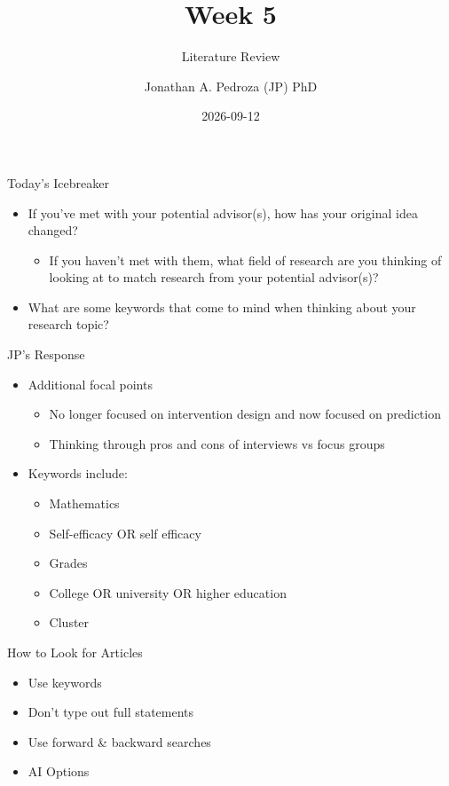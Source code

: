 \documentclass[
  ignorenonframetext,
]{beamer}
\title{Week 5}
\subtitle{Literature Review}
\author{Jonathan A. Pedroza (JP) PhD}
\date{2026-09-12}
\providecommand{\tightlist}{%
  \setlength{\itemsep}{0pt}\setlength{\parskip}{0pt}}
\begin{document}
\frame{\titlepage}


\begin{frame}{Today's Icebreaker}
\label{todays-icebreaker}
\begin{itemize}
\tightlist
\item
  If you've met with your potential advisor(s), how has your original
  idea changed?

  \begin{itemize}
  \tightlist
  \item
    If you haven't met with them, what field of research are you
    thinking of looking at to match research from your potential
    advisor(s)?
  \end{itemize}
\item
  What are some keywords that come to mind when thinking about your
  research topic?
\end{itemize}
\end{frame}

\begin{frame}{JP's Response}
\label{jps-response}
\begin{itemize}
\tightlist
\item
  Additional focal points

  \begin{itemize}
  \tightlist
  \item
    No longer focused on intervention design and now focused on
    prediction
  \item
    Thinking through pros and cons of interviews vs focus groups
  \end{itemize}
\item
  Keywords include:

  \begin{itemize}
  \tightlist
  \item
    Mathematics
  \item
    Self-efficacy OR self efficacy
  \item
    Grades
  \item
    College OR university OR higher education
  \item
    Cluster
  \end{itemize}
\end{itemize}
\end{frame}

\begin{frame}{How to Look for Articles}
\label{how-to-look-for-articles}
\begin{itemize}
\item
  Use keywords
\item
  Don't type out full statements
\item
  Use forward \& backward searches
\item
  AI Options
\end{itemize}
\end{frame}
\end{document}
